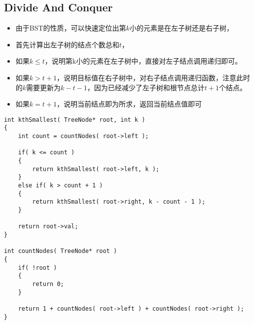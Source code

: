 \subsection{Divide And Conquer}
\begin{CJK*}{UTF8}{gbsn}
\begin{itemize}
\item 由于BST的性质，可以快速定位出第$k$小的元素是在左子树还是右子树，
\item 首先计算出左子树的结点个数总和$t$，
\item 如果$k\leq t$，说明第k小的元素在左子树中，直接对左子结点调用递归即可。
\item 如果$k>t+1$，说明目标值在右子树中，对右子结点调用递归函数，注意此时的$k$需要更新为$k-t-1$，因为已经减少了左子树和根节点总计$t+1$个结点。
\item 如果$k=t+1$，说明当前结点即为所求，返回当前结点值即可
\end{itemize}
\end{CJK*}
\begin{lstlisting}[style=customc, caption={Divide And Conquer}]
int kthSmallest( TreeNode* root, int k )
{
    int count = countNodes( root->left );

    if( k <= count )
    {
        return kthSmallest( root->left, k );
    }
    else if( k > count + 1 )
    {
        return kthSmallest( root->right, k - count - 1 );
    }

    return root->val;
}

int countNodes( TreeNode* root )
{
    if( !root )
    {
        return 0;
    }

    return 1 + countNodes( root->left ) + countNodes( root->right );
}
\end{lstlisting}
